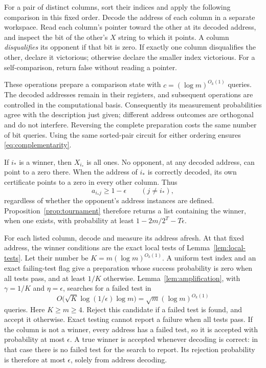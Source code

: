 \documentclass[11pt]{article}
\theoremstyle{definition}
\begin{document}
For a pair of distinct columns, sort their indices and apply the
following comparison in this fixed order. Decode the address of each
column in a separate workspace. Read each column's pointer toward the
other at its decoded address, and inspect the bit of the other's $X$
string to which it points. A column \emph{disqualifies} its opponent if
that bit is zero. If exactly one column disqualifies the other, declare
it victorious; otherwise declare the smaller index victorious. For
a self-comparison, return false without reading a pointer.

These operations prepare a comparison state with
$c=(\log m)^{O_k(1)}$ queries. The decoded addresses remain in their
registers, and subsequent operations are controlled in the
computational basis. Consequently its measurement probabilities agree
with the description just given; different address outcomes are
orthogonal and do not interfere. Reversing the complete preparation
costs the same number of bit queries. Using the same sorted-pair
circuit for either ordering ensures \eqref{eq:complementarity}.

If $i_\ast$ is a winner, then $X_{i_\ast}$ is all ones. No opponent,
at any decoded address, can point to a zero there. When the address
of $i_\ast$ is correctly decoded, its own certificate points to a zero
in every other column. Thus
\[
 a_{i_\ast j}\ge1-\epsilon\qquad(j\ne i_\ast),
\]
regardless of whether the opponent's address instances are defined.
Proposition~\ref{prop:tournament} therefore returns a list containing
the winner, when one exists, with probability at least
$1-2m/2^T-T\epsilon$.

For each listed column, decode and measure its address afresh. At that
fixed address, the winner conditions are the exact local tests of
Lemma~\ref{lem:local-tests}. Let their number be
$K=m(\log m)^{O_k(1)}$. A uniform test index and an exact failing-test
flag give a preparation whose success probability is zero when all
tests pass, and at least $1/K$ otherwise. Lemma~\ref{lem:amplification},
with $\gamma=1/K$ and $\eta=\epsilon$, searches for a failed test in
\[
 O\bigl(\sqrt K\log(1/\epsilon)\log m\bigr)
   =\sqrt m(\log m)^{O_k(1)}
\]
queries. Here $K\ge m\ge4$. Reject this candidate if a failed test is
found, and accept it otherwise. Exact testing cannot report a failure
when all tests pass. If the column is not a winner, every address has
a failed test, so it is accepted with probability at most $\epsilon$.
A true winner is accepted whenever decoding is correct: in that case
there is no failed test for the search to report. Its rejection
probability is therefore at most $\epsilon$, solely from address decoding.
\end{document}

